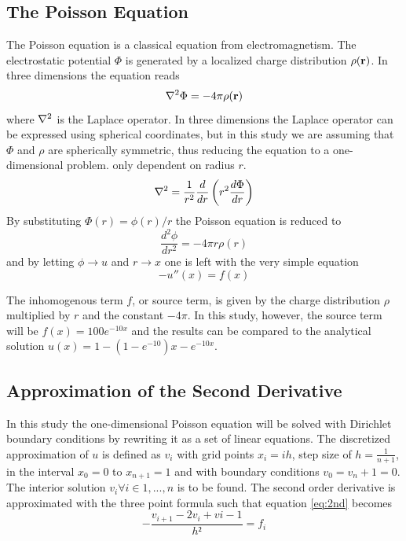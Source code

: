 \documentclass[10pt, a4paper]{amsart}
\begin{document}
\subsection{The Poisson Equation}
The Poisson equation is a classical equation from electromagnetism. The electrostatic potential $\Phi$ is generated by a localized charge distribution $\rho(\vb{r})$. In three dimensions the equation reads
\begin{equation}
\laplacian\Phi=-4\pi \rho(\vb{r})
\end{equation}
where $\laplacian$ is the Laplace operator. In three dimensions the Laplace operator can be expressed using spherical coordinates, but in this study we are assuming that $\Phi$ and $\rho$ are spherically symmetric, thus reducing the equation to a one-dimensional problem. only dependent on radius $r$.
\begin{equation}
\laplacian=\frac{1}{r^2}\frac{d}{dr}\left(r^2\frac{d\Phi}{dr} \right)
\end{equation}
By substituting $\Phi(r)=\phi(r)/r$ the Poisson equation is reduced to 
\begin{equation}
\frac{d^2\phi}{dr^2}=-4\pi r\rho(r)
\end{equation}
and by letting $\phi \rightarrow u$ and $r \rightarrow x$ one is left with the very simple equation
\begin{equation}
-u''(x)=f(x) \label{eq:2nd}
\end{equation}

The inhomogenous term $f$, or source term, is given by the charge distribution $\rho$ multiplied by $r$ and the constant $-4\pi$. In this study, however, the source term will be $f(x)=100e^{-10x}$ and the results can be compared to the analytical solution $u(x)=1-(1-e^{-10})x-e^{-10x}$. 


\subsection{Approximation of the Second Derivative}
In this study the one-dimensional Poisson equation will be solved with Dirichlet boundary conditions by rewriting it as a set of linear equations. The discretized approximation of $u$ is defined as $v_i$ with grid points $x_i=ih$, step size of $h=\frac{1}{n+1}$, in the interval $x_0=0$ to $x_{n+1}=1$ and with boundary conditions $v_0=v_n+1=0$. The interior solution $v_i \forall i \in {1,...,n}$ is to be found. The second order derivative is approximated with the three point formula such that equation \ref{eq:2nd} becomes
\begin{equation}
-\frac{v_{i+1}-2v_i+v{i-1}}{h²}=f_i \label{eq:2approx}
\end{equation}
\end{document}
